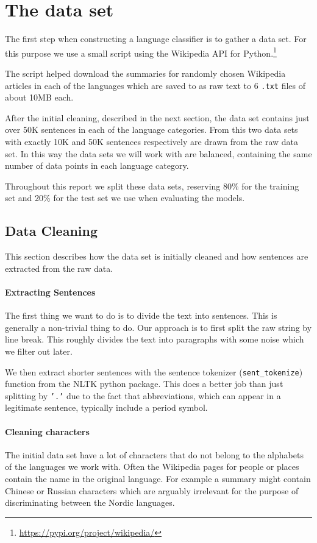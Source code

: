 
\section{The data set}
The first step when constructing a language classifier is to gather a data set. For this purpose we use a small script using the Wikipedia API for Python.\footnote{\url{https://pypi.org/project/wikipedia/}}

The script helped download the summaries for randomly chosen Wikipedia articles in each of the languages which are saved to as raw text to 6 {\tt .txt} files of about 10MB each.

After the initial cleaning, described in the next section, the data set contains just over 50K sentences in each of the language categories. From this two data sets with exactly 10K and 50K sentences respectively are drawn from the raw data set. In this way the data sets we will work with are balanced, containing the same number of data points in each language category.

Throughout this report we split these data sets, reserving 80\% for the training set and 20\% for the test set we use when evaluating the models.

\subsection{Data Cleaning}
This section describes how the data set is initially cleaned and how sentences are extracted from the raw data.

\paragraph{Extracting Sentences}

The first thing we want to do is to divide the text into sentences.
This is generally a non-trivial thing to do. Our approach is to first split the raw string by line break.
This roughly divides the text into paragraphs with some noise which we filter out later.

We then extract shorter sentences with the sentence tokenizer ({\tt sent\_tokenize}) function from the NLTK\cite{nltk} python package. This does a better job than just splitting by {\tt '.'} due to the fact that abbreviations, which can appear in a legitimate sentence, typically include a period symbol.

\paragraph{Cleaning characters}
The initial data set have a lot of characters that do not belong to the alphabets of the languages we work with. Often the Wikipedia pages for people or places contain the name in the original language. For example a summary might contain Chinese or Russian characters which are arguably irrelevant for the purpose of discriminating between the Nordic languages.


